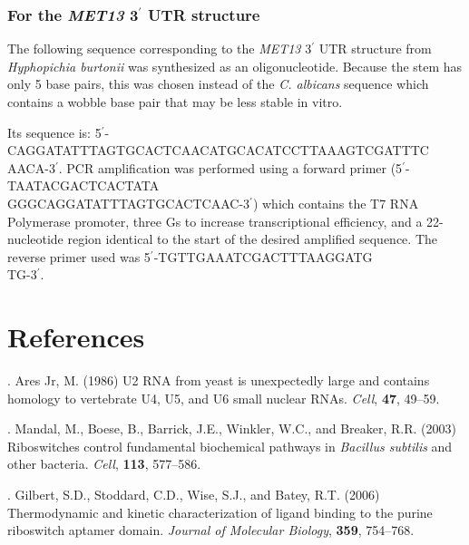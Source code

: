 \documentclass[12pt]{report}
\begin{document}
\subsubsection{For the \textit{MET13} 3$^\prime$ UTR structure}

The following sequence corresponding to the \textit{MET13} 3$^\prime$ UTR structure from \textit{Hyphopichia burtonii} was synthesized as an oligonucleotide. Because the stem has only 5 base pairs, this was chosen instead of the \textit{C. albicans} sequence which contains a wobble base pair that may be less stable in vitro.

Its sequence is:
5$^\prime$-CAGGATATTTAGTGCACTCAACATGCACATCCTTAAAGTCGATTTC\\AACA-3$^\prime$. PCR amplification was performed using a forward primer (5$^\prime$-TAATACGACTCACTATA\\GGGCAGGATATTTAGTGCACTCAAC-3$^\prime$) which contains the T7 RNA Polymerase promoter, three Gs to increase transcriptional efficiency, and a 22-nucleotide region identical to the start of the desired amplified sequence. The reverse primer used was  5$^\prime$-TGTTGAAATCGACTTTAAGGATG\\TG-3$^\prime$.

\section{References}

\phantom{1234}

. Ares Jr, M. (1986)
U2 RNA from yeast is unexpectedly large and contains homology to vertebrate U4, U5, and U6 small nuclear RNAs.
\textit{Cell}, \textbf{47}, 49--59.

. Mandal, M., Boese, B., Barrick, J.E., Winkler, W.C., and Breaker, R.R. (2003)
Riboswitches control fundamental biochemical pathways in \textit{Bacillus subtilis} and other bacteria. 
\textit{Cell}, \textbf{113}, 577--586.

. Gilbert, S.D., Stoddard, C.D., Wise, S.J., and Batey, R.T. (2006)
Thermodynamic and kinetic characterization of ligand binding to the purine riboswitch aptamer domain.
\textit{Journal of Molecular Biology}, \textbf{359}, 754--768.

\pagestyle{plain}
\end{document}
